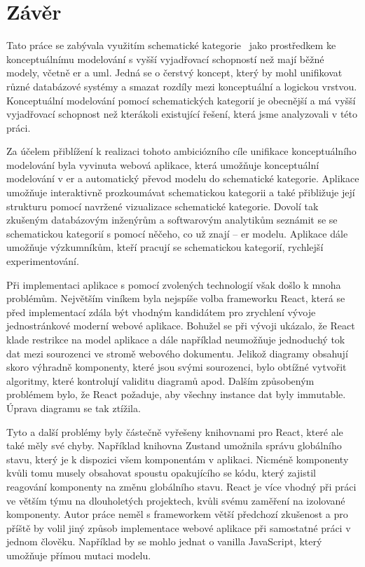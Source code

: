 \chapter*{Závěr}

Tato práce se zabývala využitím schematické kategorie~\cite{svoboda_categorical_2021} jako prostředkem ke konceptuálnímu modelování s vyšší vyjadřovací schopností než mají běžné modely, včetně \acrshort{er} a \acrshort{uml}.
Jedná se o čerstvý koncept, který by mohl unifikovat různé databázové systémy a smazat rozdíly mezi konceptuální a logickou vrstvou.
Konceptuální modelování pomocí schematických kategorií je obecnější a má vyšší vyjadřovací schopnost než kterákoli existující řešení, která jsme analyzovali v této práci.

Za účelem přiblížení k realizaci tohoto ambiciózního cíle unifikace konceptuálního modelování byla vyvinuta webová aplikace, která umožňuje konceptuální modelování v \acrshort{er} a automatický převod modelu do schematické kategorie.
Aplikace umožňuje interaktivně prozkoumávat schematickou kategorii a také přibližuje její strukturu pomocí navržené vizualizace schematické kategorie.
Dovolí tak zkušeným databázovým inženýrům a softwarovým analytikům seznámit se se schematickou kategorií s pomocí něčeho, co už znají -- \acrshort{er} modelu.
Aplikace dále umožňuje výzkumníkům, kteří pracují se schematickou kategorií, rychlejší experimentování.

Při implementaci aplikace s pomocí zvolených technologií však došlo k mnoha problémům.
Největším viníkem byla nejspíše volba frameworku React, která se před implementací zdála být vhodným kandidátem pro zrychlení vývoje jednostránkové moderní webové aplikace.
Bohužel se při vývoji ukázalo, že React klade restrikce na model aplikace a dále například neumožňuje jednoduchý tok dat mezi sourozenci ve stromě webového dokumentu.
Jelikož diagramy obsahují skoro výhradně komponenty, které jsou svými sourozenci, bylo obtížné vytvořit algoritmy, které kontrolují validitu diagramů apod.
Dalším způsobeným problémem bylo, že React požaduje, aby všechny instance dat byly immutable.
Úprava diagramu se tak ztížila.

Tyto a další problémy byly částečně vyřešeny knihovnami pro React, které ale také měly své chyby.
Například knihovna Zustand umožnila správu globálního stavu, který je k dispozici všem komponentám v aplikaci.
Nicméně komponenty kvůli tomu musely obsahovat spoustu opakujícího se kódu, který zajistil reagování komponenty na změnu globálního stavu.
React je více vhodný při práci ve větším týmu na dlouholetých projektech, kvůli svému zaměření na izolované komponenty.
Autor práce neměl s frameworkem větší předchozí zkušenost a pro příště by volil jiný způsob implementace webové aplikace při samostatné práci v jednom člověku.
Například by se mohlo jednat o vanilla JavaScript, který umožňuje přímou mutaci modelu.

